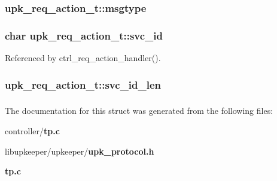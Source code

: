 \subsubsection[{msgtype}]{ {\bf upk\_\-req\_\-action\_\-t::msgtype}}\label{structupk__req__action__t_ac322c2e5607c3eddbd6a804340e07f88}
\subsubsection[{svc\_\-id}]{\setlength{\rightskip}{0pt plus 5cm}char {\bf upk\_\-req\_\-action\_\-t::svc\_\-id}}\label{structupk__req__action__t_a15dfa4fee4f209e9229e79fc434989eb}


Referenced by ctrl\_\-req\_\-action\_\-handler().

\subsubsection[{svc\_\-id\_\-len}]{ {\bf upk\_\-req\_\-action\_\-t::svc\_\-id\_\-len}}\label{structupk__req__action__t_a57d6575483be35147fd464921670fb21}
\subsubsection[{UPK\_\-V0\_\-REQ\_\-ACTION\_\-T\_\-FIELDS}]{}\label{structupk__req__action__t_ade60e37e9de796558057acc11c27f5fa}


The documentation for this struct was generated from the following files:\begin{DoxyCompactItemize}
\item 
controller/{\bf tp.c}\item 
libupkeeper/upkeeper/{\bf upk\_\-protocol.h}\item 
{\bf tp.c}\end{DoxyCompactItemize}
